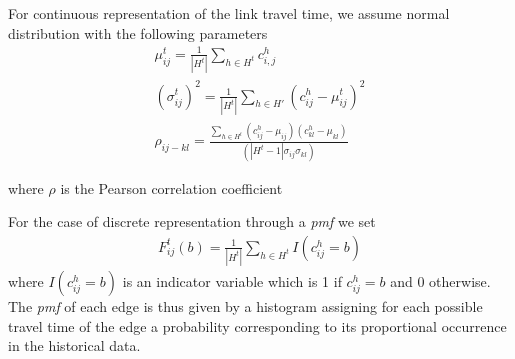 For continuous representation of the link travel time, we assume normal distribution with the following parameters
\begin{gather}
	\mu_{ij}^t = \frac{1}{|H^t|}\sum_{h\in H^t} c_{i,j}^h\\ 
	(\sigma_{ij}^t)^2 = \frac{1}{|H^t|}\sum_{h\in H'} (c_{ij}^h-\mu_{ij}^t)^2\\
	\rho_{ij-kl} = \frac{\sum_{h\in H^t} (c_{ij}^h - \mu_{ij}) (c_{kl}^h -
	\mu_{kl})}{(|H^t-1| \sigma_{ij} \sigma_{kl})}
\end{gather}

where $\rho$ is the Pearson correlation coefficient \cite{Soper17}

For the case of discrete representation through a \textit{pmf} we set
\begin{gather}
F_{ij}^t(b) = \frac{1}{|H^t|}\sum_{h\in H^t} I(c_{ij}^h = b)
\end{gather}
where $I(c_{ij}^h = b)$ is an indicator variable which is 1 if $c_{ij}^h =
b$ and 0 otherwise. The \textit{pmf} of each edge is thus given by a histogram
assigning for each possible travel time of the edge a probability corresponding to its
proportional occurrence in the historical data. 


